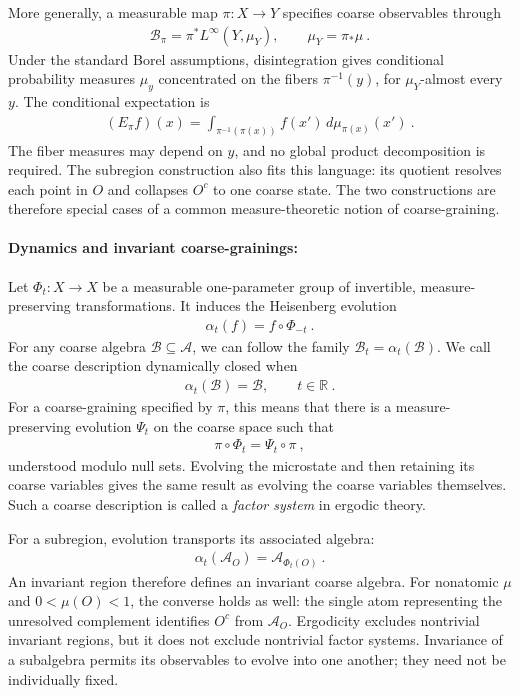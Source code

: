 \documentclass[a4paper,11pt]{article}
\theoremstyle{definition}
\newcommand{\mA}{\mathcal{A}}
\newcommand{\mB}{\mathcal{B}}
\begin{document}
More generally, a measurable map $\pi:X\to Y$ specifies coarse observables through
\begin{align}
    \mB_\pi=\pi^*L^\infty(Y,\mu_Y),
    \qquad \mu_Y=\pi_*\mu\ .
\end{align}
Under the standard Borel assumptions, disintegration gives conditional probability measures $\mu_y$ concentrated on the fibers $\pi^{-1}(y)$, for $\mu_Y$-almost every $y$. The conditional expectation is
\begin{align}
    (E_\pi f)(x)=\int_{\pi^{-1}(\pi(x))}f(x')\,d\mu_{\pi(x)}(x')\ .
\end{align}
The fiber measures may depend on $y$, and no global product decomposition is required. The subregion construction also fits this language: its quotient resolves each point in $O$ and collapses $O^c$ to one coarse state. The two constructions are therefore special cases of a common measure-theoretic notion of coarse-graining.

\paragraph{Dynamics and invariant coarse-grainings:}
Let $\Phi_t:X\to X$ be a measurable one-parameter group of invertible, measure-preserving transformations. It induces the Heisenberg evolution
\begin{align}
    \alpha_t(f)=f\circ\Phi_{-t}\ .
\end{align}
For any coarse algebra $\mB\subseteq\mA$, we can follow the family $\mB_t=\alpha_t(\mB)$. We call the coarse description dynamically closed when
\begin{align}\label{eq:classical-coarse-invariance}
    \alpha_t(\mB)=\mB,\qquad t\in\mathbb R\ .
\end{align}
For a coarse-graining specified by $\pi$, this means that there is a measure-preserving evolution $\Psi_t$ on the coarse space such that
\begin{align}\label{eq:classical-factor-intertwining}
    \pi\circ\Phi_t=\Psi_t\circ\pi\ ,
\end{align}
understood modulo null sets. Evolving the microstate and then retaining its coarse variables gives the same result as evolving the coarse variables themselves. Such a coarse description is called a {\it factor system} in ergodic theory.

For a subregion, evolution transports its associated algebra:
\begin{align}
    \alpha_t(\mA_O)=\mA_{\Phi_t(O)}\ .
\end{align}
An invariant region therefore defines an invariant coarse algebra. For nonatomic $\mu$ and $0<\mu(O)<1$, the converse holds as well: the single atom representing the unresolved complement identifies $O^c$ from $\mA_O$. Ergodicity excludes nontrivial invariant regions, but it does not exclude nontrivial factor systems. Invariance of a subalgebra permits its observables to evolve into one another; they need not be individually fixed.
\end{document}
